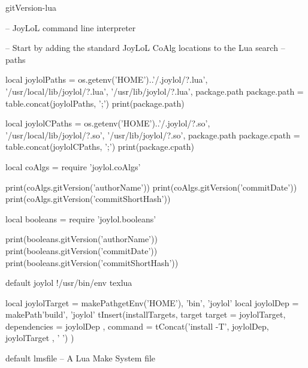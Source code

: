
\startchapter[title=Preamble]


\component gitVersion-lua

\startLuaCode
-- JoyLoL command line interpreter 

-- Start by adding the standard JoyLoL CoAlg locations to the Lua search 
-- paths 

local joylolPaths = {
  os.getenv('HOME')..'/.joylol/?.lua',
  '/usr/local/lib/joylol/?.lua',
  '/usr/lib/joylol/?.lua',
  package.path
}
package.path = table.concat(joylolPaths, ';')
print(package.path)

local joylolCPaths = {
  os.getenv('HOME')..'/.joylol/?.so',
  '/usr/local/lib/joylol/?.so',
  '/usr/lib/joylol/?.so',
  package.path
}
package.cpath = table.concat(joylolCPaths, ';')
print(package.cpath)

local coAlgs = require 'joylol.coAlgs'

print(coAlgs.gitVersion('authorName'))
print(coAlgs.gitVersion('commitDate'))
print(coAlgs.gitVersion('commitShortHash'))

local booleans = require 'joylol.booleans'

print(booleans.gitVersion('authorName'))
print(booleans.gitVersion('commitDate'))
print(booleans.gitVersion('commitShortHash'))

\stopLuaCode


\createLuaCodeFile%
  {default}%
  {joylol}%
  {!/usr/bin/env texlua}



\startLmsfile
local joylolTarget = makePath{getEnv('HOME'), 'bin', 'joylol'}
local joylolDep    = makePath{'build', 'joylol'}
tInsert(installTargets, target{
  target       = joylolTarget,
  dependencies = { joylolDep },
  command      = tConcat({'install -T', joylolDep, joylolTarget }, ' ')
})
\stopLmsfile


\createLmsfileFile%
  {default}%
  {lmsfile}%
  {-- A Lua Make System file}

\stopchapter